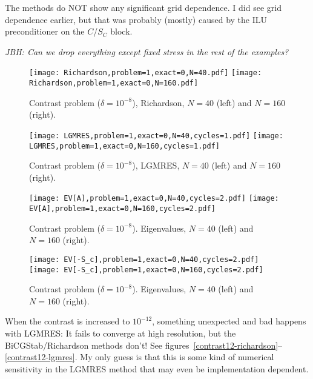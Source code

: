 \documentclass{article}
\begin{document}
The methods do NOT show any significant grid dependence. I did see grid dependence earlier, but that was probably (mostly) caused by the ILU preconditioner on the $C$/$S_C$ block.

\emph{JBH: Can we drop everything except fixed stress in the rest of the examples?}


\begin{figure}
\begin{center}
\texttt{[image: Richardson,problem=1,exact=0,N=40.pdf]}
\texttt{[image: Richardson,problem=1,exact=0,N=160.pdf]}
\caption{Contrast problem ($\delta=10^{-8}$), Richardson, $N=40$ (left) and $N=160$ (right).}
\label{contrast-richardson}
\end{center}
\end{figure}

\begin{figure}
\begin{center}
\texttt{[image: LGMRES,problem=1,exact=0,N=40,cycles=1.pdf]}
\texttt{[image: LGMRES,problem=1,exact=0,N=160,cycles=1.pdf]}
\caption{Contrast problem ($\delta=10^{-8}$), LGMRES, $N=40$ (left) and $N=160$ (right).}
\label{contrast-lgmres}
\end{center}
\end{figure}

\begin{figure}
\begin{center}
\texttt{[image: EV[A],problem=1,exact=0,N=40,cycles=2.pdf]}
\texttt{[image: EV[A],problem=1,exact=0,N=160,cycles=2.pdf]}
\caption{Contrast problem ($\delta=10^{-8}$). Eigenvalues, $N=40$ (left) and $N=160$ (right).}
\label{contrast-evA}
\end{center}
\end{figure}

\begin{figure}
\begin{center}
\texttt{[image: EV[-S\_c],problem=1,exact=0,N=40,cycles=2.pdf]}
\texttt{[image: EV[-S\_c],problem=1,exact=0,N=160,cycles=2.pdf]}
\caption{Contrast problem ($\delta=10^{-8}$). Eigenvalues, $N=40$ (left) and $N=160$ (right).}
\end{center}
\label{contrast-evS}
\end{figure}

\FloatBarrier

When the contrast is increased to $10^{-12}$, something unexpected and bad happens with LGMRES: It fails to converge at high resolution, but the BiCGStab/Richardson methods don't! See figures~\ref{contrast12-richardson}--\ref{contrast12-lgmres}. My only guess is that this is some kind of numerical sensitivity in the LGMRES method that may even be implementation dependent.
\end{document}
